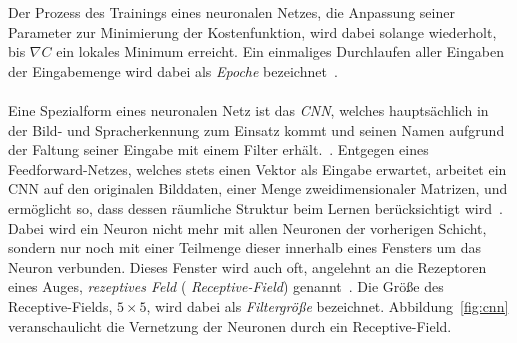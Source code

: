 Der Prozess des Trainings eines neuronalen Netzes, \dhe{} die Anpassung seiner Parameter zur Minimierung der Kostenfunktion, wird dabei solange wiederholt, bis $\nabla C$ ein lokales Minimum erreicht.
Ein einmaliges Durchlaufen aller Eingaben der Eingabemenge wird dabei als \emph{Epoche} bezeichnet~\cite{Nielsen}.
\\\\
Eine Spezialform eines neuronalen Netz ist das \emph{\gls{CNN}}, welches hauptsächlich in der Bild- und Spracherkennung zum Einsatz kommt und seinen Namen aufgrund der Faltung seiner Eingabe mit einem Filter erhält.~\cite{cnn}.
Entgegen eines Feedforward-Netzes, welches stets einen Vektor als Eingabe erwartet, arbeitet ein \gls{CNN} auf den originalen Bilddaten, \dhe{} einer Menge zweidimensionaler Matrizen, und ermöglicht so, dass dessen räumliche Struktur beim Lernen berücksichtigt wird~\cite{Nielsen}.
Dabei wird ein Neuron nicht mehr mit allen Neuronen der vorherigen Schicht, sondern nur noch mit einer Teilmenge dieser innerhalb eines Fensters um das Neuron verbunden.
Dieses Fenster wird auch oft, angelehnt an die Rezeptoren eines Auges, \emph{rezeptives Feld} (\engl{} \emph{Receptive-Field}) genannt~\cite{cnn}.
Die Größe des Receptive-Fields, \zB{} $5 \times 5$, wird dabei als \emph{Filtergröße} bezeichnet.
Abbildung~\ref{fig:cnn} veranschaulicht die Vernetzung der Neuronen durch ein Receptive-Field.


